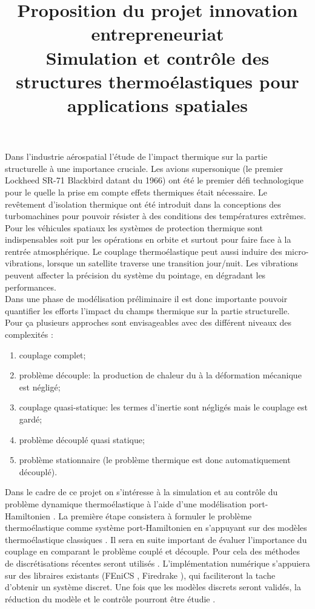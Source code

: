 \documentclass[french]{article}
\begin{document}
\title{Proposition du projet innovation entrepreneuriat \\
Simulation et contrôle des structures thermoélastiques pour applications spatiales}

\maketitle

Dans l'industrie aérospatial l'étude de l'impact thermique sur la partie structurelle à une importance cruciale. Les avions supersonique (le premier Lockheed SR-71 Blackbird datant du 1966)  ont été le premier défi technologique pour le quelle la prise em compte effets thermiques était nécessaire. Le revêtement d'isolation thermique ont été introduit dans la conceptions des turbomachines pour pouvoir résister à des conditions des températures extrêmes. Pour les véhicules spatiaux les systèmes de protection thermique sont indispensables soit pur les opérations en orbite et surtout pour faire face à la rentrée atmosphérique. Le couplage thermoélastique peut aussi induire des micro-vibrations, lorsque un satellite traverse une transition jour/nuit. Les vibrations peuvent affecter la précision du système du pointage, en dégradant les performances. \\

Dans une phase de modélisation préliminaire il est donc importante pouvoir quantifier les efforts l'impact du champs thermique sur la partie structurelle. Pour ça plusieurs approches sont envisageables avec des différent niveaux des complexités \cite{thstress_book}:
\begin{enumerate}
	\item couplage complet;
	\item problème découple: la production de chaleur du à la déformation mécanique est négligé;
	\item couplage quasi-statique: les termes d'inertie sont négligés mais le couplage est gardé;
	\item problème découplé quasi statique;
	\item problème stationnaire (le problème thermique est donc automatiquement découplé).
\end{enumerate}

Dans le cadre de ce projet on s'intéresse à la simulation et au contrôle du problème dynamique thermoélastique à l'aide d'une modélisation port-Hamiltonien \cite{BrugnoliKir,BrugnoliMin,TFMST1,TFMST2}. La première étape consistera à formuler le problème thermoélastique comme système port-Hamiltonien en s'appuyant sur des modèles thermoélastique classiques  \cite{HANSEN1997182,ThTimoshenko,ThLasiecka}. Il sera en suite important de évaluer l'importance du couplage en comparant le problème couplé et découple. Pour cela des méthodes de discrétisations récentes seront utilisés \cite{PFEM}. L'implémentation numérique s'appuiera sur des libraires existants (FEniCS \cite{LoggMardalEtAl2012}, Firedrake \cite{firedrake}), qui faciliteront la tache d'obtenir un système discret. Une fois que les modèles discrets seront validés, la réduction du modèle et le contrôle pourront être étudie \cite{modred,phAdaptive,pbcontrol}. \\
\end{document}
